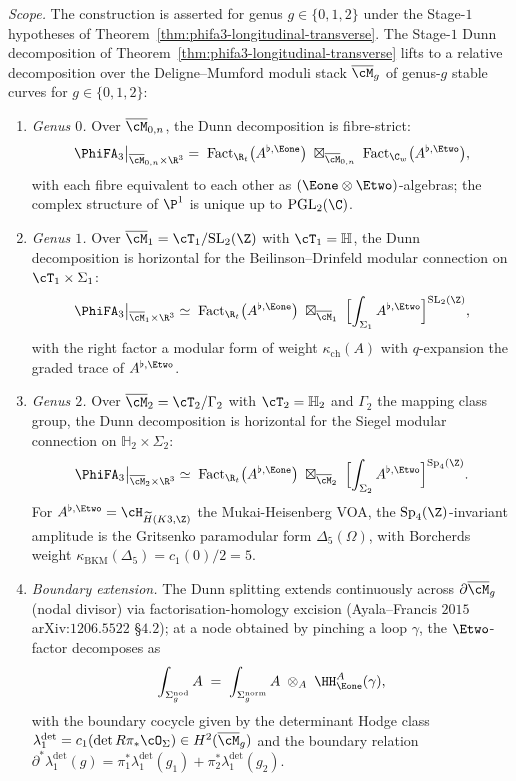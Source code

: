 \begin{theorem}
\label{thm:genus-tower-dunn-phifa3}
\noindent\emph{Scope.} The construction is asserted for genus
\(g\in\{0,1,2\}\) under the Stage-$1$ hypotheses of
Theorem~\ref{thm:phifa3-longitudinal-transverse}.
The Stage-$1$ Dunn decomposition of Theorem~\ref{thm:phifa3-longitudinal-transverse} lifts to a relative decomposition over the Deligne--Mumford moduli stack $\overline{\cM}_g$ of genus-$g$ stable curves for $g \in \{0, 1, 2\}$:
\begin{enumerate}[label=(\roman*)]
\item \emph{Genus $0$.} Over $\overline{\cM}_{0, n}$, the Dunn decomposition is fibre-strict:
\[
 \PhiFA_3\bigl|_{\overline{\cM}_{0, n} \times \R^3}
 \;=\;
 \mathrm{Fact}_{\R_t}\bigl(A^{\flat, \Eone}\bigr) \;\boxtimes_{\overline{\cM}_{0, n}}\; \mathrm{Fact}_{\C_w}\bigl(A^{\flat, \Etwo}\bigr),
\]
with each fibre equivalent to each other as $(\Eone \otimes \Etwo)$-algebras; the complex structure of $\P^1$ is unique up to $\operatorname{PGL}_2(\C)$.
\item \emph{Genus $1$.} Over $\overline{\cM}_1 = \cT_1 / \mathrm{SL}_2(\Z)$ with $\cT_1 = \mathbb H$, the Dunn decomposition is horizontal for the Beilinson--Drinfeld modular connection on $\cT_1 \times \Sigma_1$:
\[
 \PhiFA_3\bigl|_{\overline{\cM}_1 \times \R^3}
 \;\simeq\;
 \mathrm{Fact}_{\R_t}\bigl(A^{\flat, \Eone}\bigr)
 \;\boxtimes_{\overline{\cM}_1}\;
 \Bigl[\int_{\Sigma_1} A^{\flat, \Etwo}\Bigr]^{\mathrm{SL}_2(\Z)},
\]
with the right factor a modular form of weight $\kappa_{\mathrm{ch}}(A)$ with $q$-expansion the graded trace of $A^{\flat, \Etwo}$.
\item \emph{Genus $2$.} Over $\overline{\cM}_2 = \cT_2 / \Gamma_2$ with $\cT_2 = \mathbb H_2$ and $\Gamma_2$ the mapping class group, the Dunn decomposition is horizontal for the Siegel modular connection on $\mathbb H_2 \times \Sigma_2$:
\[
 \PhiFA_3\bigl|_{\overline{\cM}_2 \times \R^3}
 \;\simeq\;
 \mathrm{Fact}_{\R_t}\bigl(A^{\flat, \Eone}\bigr)
 \;\boxtimes_{\overline{\cM}_2}\;
 \Bigl[\int_{\Sigma_2} A^{\flat, \Etwo}\Bigr]^{\mathrm{Sp}_4(\Z)}.
\]
For $A^{\flat, \Etwo} = \cH_{\widetilde H(K3, \Z)}$ the Mukai-Heisenberg VOA, the $\mathrm{Sp}_4(\Z)$-invariant amplitude is the Gritsenko paramodular form $\Delta_5(\Omega)$, with Borcherds weight $\kappa_{\mathrm{BKM}}(\Delta_5) = c_1(0)/2 = 5$.
\item \emph{Boundary extension.} The Dunn splitting extends continuously across $\partial\overline{\cM}_g$ (nodal divisor) via factorisation-homology excision (Ayala--Francis $2015$ arXiv:$1206.5522$ \S$4.2$); at a node obtained by pinching a loop $\gamma$, the $\Etwo$-factor decomposes as
\[
 \int_{\Sigma_g^{\mathrm{nod}}} A \;=\; \int_{\Sigma_g^{\mathrm{norm}}} A \;\otimes_A\; \HH^A_{\Eone}(\gamma),
\]
with the boundary cocycle given by the determinant Hodge class $\lambda_1^{\det}=c_1(\det R\pi_* \cO_{\Sigma}) \in H^2(\overline{\cM}_g)$ and the boundary relation $\partial^* \lambda_1^{\det}(g) = \pi_1^* \lambda_1^{\det}(g_1) + \pi_2^* \lambda_1^{\det}(g_2)$.
\end{enumerate}
\end{theorem}

